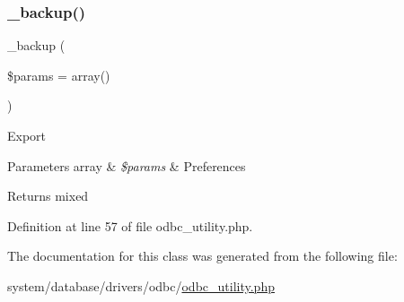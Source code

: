 \subsubsection{\texorpdfstring{\_backup()}{\_backup()}}
{\footnotesize\ttfamily \+\_\+backup (\begin{DoxyParamCaption}\item[{}]{\$params = {\ttfamily array()} }\end{DoxyParamCaption})\hspace{0.3cm}{\ttfamily [protected]}}

Export


\begin{DoxyParams}[1]{Parameters}
array & {\em \$params} & Preferences \\
\hline
\end{DoxyParams}
\begin{DoxyReturn}{Returns}
mixed 
\end{DoxyReturn}


Definition at line 57 of file odbc\+\_\+utility.\+php.



The documentation for this class was generated from the following file\+:\begin{DoxyCompactItemize}
\item 
system/database/drivers/odbc/\mbox{\hyperlink{odbc__utility_8php}{odbc\+\_\+utility.\+php}}\end{DoxyCompactItemize}
